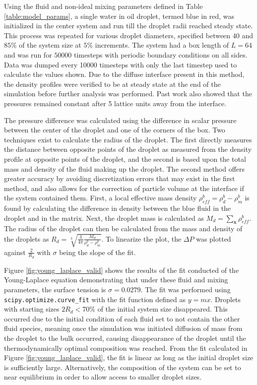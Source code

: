 Using the fluid and non-ideal mixing parameters defined in Table \ref{table:model_params}, a single water in oil 
droplet, termed blue in red, was initialized in the center system and run till the droplet radii reached steady state. 
This process was repeated for various droplet diameters, specified between $40$ and $85 \%$ of the system size at $5\%$ 
increments. The system had a box length of $L = 64$ and was run for $50000$ timesteps with periodic boundary conditions 
on all sides. Data was dumped every 10000 timesteps with only the last timestep used to calculate the values shown. Due 
to the diffuse interface present in this method, the density profiles were verified to be at steady state at the end of 
the simulation before further analysis was performed. \cite{frijters_effects_2012} Past work also showed that the 
pressures remained constant after 5 lattice units away from the interface. \cite{frijters_effects_2012} 

The pressure difference was calculated using the difference in scalar pressure between the center of the droplet and 
one of the corners of the box. Two techniques exist to calculate the radius of the droplet. The first directly measures 
the distance between opposite points of the droplet as measured from the density profile at opposite points of the droplet, 
and the second is based upon the total mass and density of the fluid making up the droplet. The second method offers greater 
accuracy by avoiding discretization errors that may exist in the first method, and also allows for the correction of 
particle volume at the interface if the system contained them. First, a local effective mass density 
$\rho^b_{eff} = \rho^{b}_{d} - \rho^{b}_{m}$ is found by calculating the difference in density between the blue 
fluid in the droplet and in the matrix. Next, the droplet mass is calculated as $M_d = \sum_{\mathbf{x}}{\rho_{eff}^{b}}$. 
The radius of the droplet can then be calculated from the mass and density of the droplets as $R_d = \sqrt[3]{\frac{3}{4\pi} 
\frac{M_d}{\rho^b_d - \rho^b_m}}$. To linearize the plot, the $\Delta P$ was plotted against $\frac{2}{R_d}$ with 
$\sigma$ being the slope of the fit.

Figure \ref{fig:young_laplace_valid} shows the results of the fit conducted of the Young-Laplace equation demonstrating 
that under these fluid and mixing parameters, the surface tension is $\sigma = 0.0279$. The fit was performed using 
\texttt{scipy.optimize.curve\_fit} with the fit function defined as $y = mx$. Droplets with starting sizes $2R_d < 70\%$ 
of the initial system size disappeared. This occurred due to the initial condition of each fluid set to not contain the 
other fluid species, meaning once the simulation was initiated diffusion of mass from the droplet to the bulk occurred, 
causing disappearance of the droplet until the thermodynamically optimal composition was reached. From the fit calculated 
in Figure \ref{fig:young_laplace_valid}, the fit is linear as long as the initial droplet size is sufficiently large. 
Alternatively, the composition of the system can be set to near equilibrium in order to allow access to smaller droplet 
sizes.

